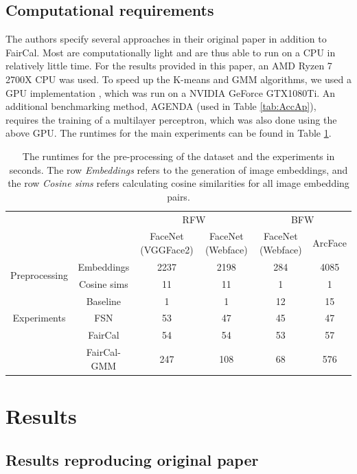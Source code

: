 \subsection{Computational requirements}
The authors specify several approaches in their original paper in addition to FairCal. Most are computationally light and are thus able to run on a CPU in relatively little time. For the results provided in this paper, an AMD Ryzen 7 2700X CPU was used. To speed up the K-means and GMM algorithms, we used a GPU implementation \citep{pycave}, which was run on a NVIDIA GeForce GTX1080Ti. An additional benchmarking method, AGENDA (used in Table \ref{tab:AccAp}), requires the training of a multilayer perceptron, which was also done using the above GPU. The runtimes for the main experiments can be found in Table \ref{tab:runtimes}.

\begin{table}[h]
\footnotesize
\centering
\begin{tabular}{c c | cc | cc}
\toprule
&& \multicolumn{2}{c}{RFW} & \multicolumn{2}{c}{BFW} \\
&& FaceNet (VGGFace2) & FaceNet (Webface) & FaceNet (Webface) & ArcFace \\  
\hline
\multirow{2}{5em}{Preprocessing} & Embeddings & 2237 & 2198 & 284 & 4085 \\
& Cosine sims & 11 & 11 & 1 & 1 \\
\hline
\multirow{3}{5em}{Experiments} 
& Baseline & 1 & 1 & 12 & 15 \\
& FSN & 53& 47 & 45 & 47 \\
& FairCal & 54 & 54 & 53 & 57 \\
& FairCal-GMM & 247 & 108 & 68 & 576 \\
\bottomrule
    
\end{tabular}
\caption{The runtimes for the pre-processing of the dataset and the experiments in seconds. The row \textit{Embeddings} refers to the generation of image embeddings, and the row \textit{Cosine sims} refers calculating cosine similarities for all image embedding pairs.}
\label{tab:runtimes}
\end{table}

\section{Results}
\label{sec:results}

\subsection{Results reproducing original paper}
